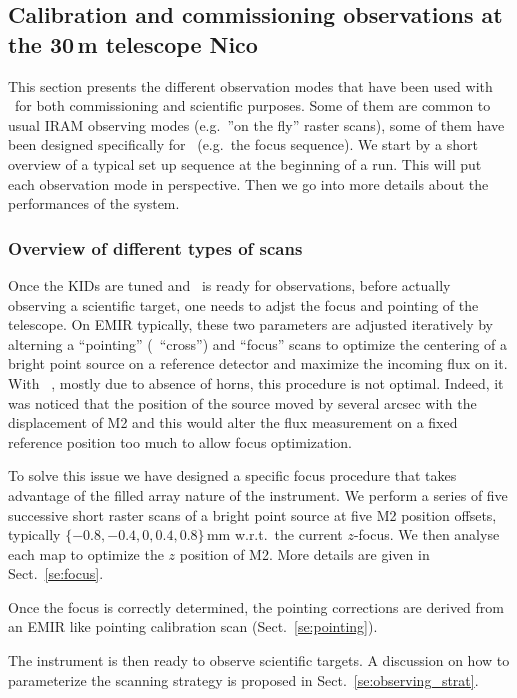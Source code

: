 
\subsection{Calibration and commissioning observations at the 30\,m telescope {\color{blue} Nico}}

This section presents the different observation modes that have been used with
\nika\ for both commissioning and scientific purposes. Some of them are common
to usual IRAM observing modes (e.g.~''on the fly'' raster scans), some of them
have been designed specifically for \nika\ (e.g.~the focus sequence). We start
by a short overview of a typical set up sequence at the beginning of a run. This
will put each observation mode in perspective. Then we go into more details
about the performances of the system.

\subsubsection{Overview of different types of scans}

Once the KIDs are tuned and \nika\ is ready for observations, before actually
observing a scientific target, one needs to adjst the focus and pointing of the
telescope. On EMIR typically, these two parameters are adjusted iteratively by
alterning a ``pointing'' (\aka\ ``cross'') and ``focus'' scans to optimize the
centering of a bright point source on a reference detector and maximize the
incoming flux on it. With \nika\ , mostly due to absence of horns, this
procedure is not optimal. Indeed, it was noticed that the position of the source
moved by several arcsec with the displacement of M2 and this would alter the flux
measurement on a fixed reference position too much to allow focus
optimization.

To solve this issue we have designed a specific focus procedure
that takes advantage of the filled array nature of the instrument. We perform a
series of five successive short raster scans of a bright point source at five M2 position
offsets, typically $\{-0.8, -0.4, 0, 0.4, 0.8\}$\,mm w.r.t.~the current
$z$-focus. We then analyse each map to optimize the $z$ position of M2. More details are
given in Sect.~\ref{se:focus}.

Once the focus is correctly determined, the pointing corrections are derived
from an EMIR like pointing calibration scan (Sect.~\ref{se:pointing}).

The instrument is then ready to observe scientific targets. A discussion on how
to parameterize the scanning strategy is proposed in Sect.~\ref{se:observing_strat}.

